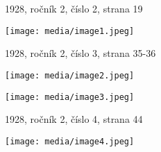 1928, ročník 2, číslo 2, strana 19

\texttt{[image: media/image1.jpeg]}

1928, ročník 2, číslo 3, strana 35-36

\texttt{[image: media/image2.jpeg]}

\texttt{[image: media/image3.jpeg]}

1928, ročník 2, číslo 4, strana 44

\texttt{[image: media/image4.jpeg]}
